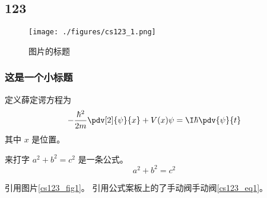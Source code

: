 
\subsection{123}

\begin{figure}[ht]
\centering
\texttt{[image: ./figures/cs123\_1.png]}
\caption{图片的标题} \label{cs123_fig1}
\end{figure}

\subsubsection{这是一个小标题}
定义薛定谔方程为
\begin{equation}\label{cs123_eq1}
-\frac{\hbar^2}{2m}\pdv[2]{\psi}{x} + V(x)\psi = \I \hbar \pdv{\psi}{t}
\end{equation}
其中 $x$ 是位置。

来打字 $a^2 + b^2 = c^2$ 是一条公式。
\begin{equation}
a^2 + b^2 = c^2
\end{equation}

引用图片\autoref{cs123_fig1}。 引用公式案板上的了手动阀手动阀\autoref{cs123_eq1}。
